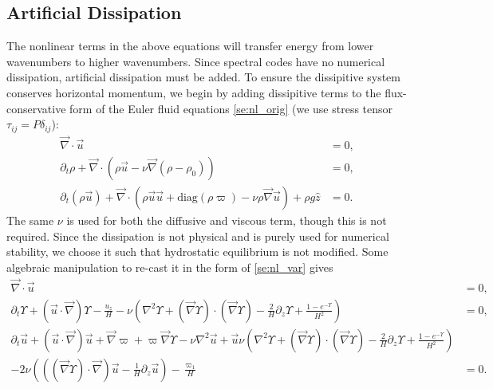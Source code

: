 \documentclass[
        fleqn,
        usenatbib,
    ]{mnras}
\newcommand*{\p}[1]{\left(#1\right)}
\begin{document}
\subsection{Artificial Dissipation}

The nonlinear terms in the above equations will transfer energy from lower
wavenumbers to higher wavenumbers. Since spectral codes have no numerical
dissipation, artificial dissipation must be added. To ensure the dissipitive
system conserves horizontal momentum, we begin by adding dissipitive terms to
the flux-conservative form of the Euler fluid equations \autoref{se:nl_orig} (we
use stress tensor $\tau_{ij} = P\delta_{ij}$):
\begin{subequations}
    \begin{align}
        \vec{\nabla} \cdot \vec{u} &= 0,\\
        \partial_t \rho + \vec{\nabla} \cdot (\rho \vec{u} - \nu
            \vec{\nabla}(\rho - \rho_0)) &= 0,\label{eq:visc_cons_mom}\\
        \partial_t (\rho \vec{u}) + \vec{\nabla} \cdot (\rho \vec{u}
        \vec{u} +
            \mathrm{diag}(\rho \varpi) - \nu \rho \vec{\nabla}\vec{u}) + \rho g
            \hat{z} &= 0.
    \end{align}
\end{subequations}
The same $\nu$ is used for both the diffusive and viscous term, though this is
not required. Since the dissipation is not physical and is purely used for
numerical stability, we choose it such that hydrostatic equilibrium is not
modified. Some algebraic manipulation to re-cast it in the form of
\autoref{se:nl_var} gives
\begin{subequations}
    \begin{align}
        \vec{\nabla} \cdot \vec{u} &= 0,\\
        \partial_t \Upsilon + \p{\vec{u} \cdot \vec{\nabla}} \Upsilon -
            \frac{u_z}{H} - \nu\p{\nabla^2 \Upsilon + \p{\vec{\nabla}
            \Upsilon} \cdot \p{\vec{\nabla}\Upsilon} - \frac{2}{H}\partial_z
            \Upsilon + \frac{1 - e^{-\Upsilon}}{H^2}} &= 0,\\
        \partial_t \vec{u} + \p{\vec{u} \cdot \vec{\nabla}}\vec{u} +
            \vec{\nabla} \varpi + \varpi \vec{\nabla} \Upsilon - \nu \nabla^2
            \vec{u} + \vec{u} \nu\p{\nabla^2 \Upsilon + \p{\vec{\nabla}
            \Upsilon} \cdot \p{\vec{\nabla}\Upsilon} - \frac{2}{H}\partial_z
            \Upsilon + \frac{1 - e^{-\Upsilon}}{H^2}}&{}\nonumber\\
        - 2\nu \p{\p{\p{\vec{\nabla}\Upsilon} \cdot \vec{\nabla}}\vec{u} -
            \frac{1}{H}\partial_z \vec{u}} - \frac{\varpi_1}{H} &= 0.
    \end{align}
\end{subequations}
\end{document}
